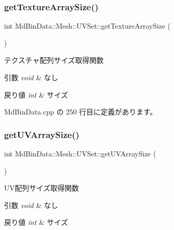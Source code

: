 \subsubsection{\texorpdfstring{get\+Texture\+Array\+Size()}{getTextureArraySize()}}
{\footnotesize\ttfamily int Md\+Bin\+Data\+::\+Mesh\+::\+U\+V\+Set\+::get\+Texture\+Array\+Size (\begin{DoxyParamCaption}{ }\end{DoxyParamCaption})}



テクスチャ配列サイズ取得関数 


\begin{DoxyParams}{引数}
{\em void} & なし \\
\hline
\end{DoxyParams}

\begin{DoxyRetVals}{戻り値}
{\em int} & サイズ \\
\hline
\end{DoxyRetVals}


 Md\+Bin\+Data.\+cpp の 250 行目に定義があります。

\mbox{\label{class_md_bin_data_1_1_mesh_1_1_u_v_set_a048625e24071483a7a64c9baa7dbccc0}} 
\subsubsection{\texorpdfstring{get\+U\+V\+Array\+Size()}{getUVArraySize()}}
{\footnotesize\ttfamily int Md\+Bin\+Data\+::\+Mesh\+::\+U\+V\+Set\+::get\+U\+V\+Array\+Size (\begin{DoxyParamCaption}{ }\end{DoxyParamCaption})}



U\+V配列サイズ取得関数 


\begin{DoxyParams}{引数}
{\em void} & なし \\
\hline
\end{DoxyParams}

\begin{DoxyRetVals}{戻り値}
{\em int} & サイズ \\
\hline
\end{DoxyRetVals}


